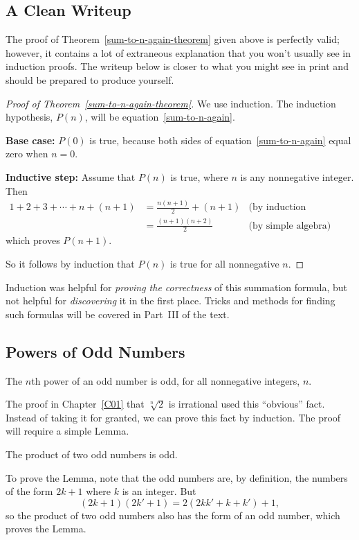 \subsection{A Clean Writeup}

The proof of Theorem~\ref{sum-to-n-again-theorem} given above is perfectly
valid; however, it contains a lot of extraneous explanation that you won't
usually see in induction proofs.  The writeup below is closer to what you
might see in print and should be prepared to produce yourself.

\begin{proof}[Proof of Theorem~\ref{sum-to-n-again-theorem}]
We use induction.  The induction hypothesis, $P(n)$, will be
equation~\eqref{sum-to-n-again}.

\textbf{Base case:} $P(0)$ is true, because both sides of
equation~\eqref{sum-to-n-again} equal zero when $n=0$.

\textbf{Inductive step:} Assume that $P(n)$ is true, where
$n$ is any nonnegative integer.  Then
\begin{align*}
1 + 2 + 3 + \cdots + n + (n+1)
    & = \frac{n(n+1)}{2} + (n+1) & \text{(by induction hypothesis)}\\
    & = \frac{(n+1)(n+2)}{2}  & \text{(by simple algebra)}
\end{align*}
which proves $P(n+1)$.

So it follows by induction that $P(n)$ is true for all nonnegative $n$.
\end{proof}

Induction was helpful for \emph{proving the correctness} of this
summation formula, but not helpful for \emph{discovering} it in the
first place.  Tricks and methods for finding such formulas will be
covered in Part~III of the text.  %


\iffalse
\subsection{Powers of Odd Numbers}

\begin{fact*}
The $n$th power of an odd number is odd, for all nonnegative integers, $n$.
\end{fact*}
The proof in Chapter~\ref{C01} that $\sqrt[n]{2}$ is irrational used this 
``obvious'' fact.  Instead of taking it for granted, we can prove this fact
by induction.
The proof will require a simple Lemma.
\begin{lemma*}
The product of two odd numbers is odd.
\end{lemma*}
To prove the Lemma, note that the odd numbers are, by definition, the
numbers of the form $2k+1$ where $k$ is an integer.  But
\[
(2k+1)(2k'+1) = 2(2kk' + k + k')+1,
\]
so the product of two odd numbers also has the form of an odd number,
which proves the Lemma.

